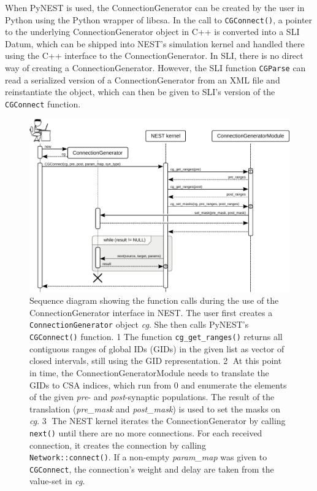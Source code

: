 \documentclass{frontiersSCNS} %
\begin{document}
When PyNEST is used, the ConnectionGenerator can be created by the
user in Python using the Python wrapper of libcsa. In the call to
\verb|CGConnect()|, a pointer to the underlying ConnectionGenerator
object in C++ is converted into a SLI Datum, which can be shipped into
NEST's simulation kernel and handled there using the C++ interface to
the ConnectionGenerator. In SLI, there is no direct way of creating a
ConnectionGenerator. However, the SLI function \verb|CGParse| can
read a serialized version of a ConnectionGenerator from an XML file
and reinstantiate the object, which can then be given to SLI's version
of the \verb|CGConnect| function.

\begin{figure}[ht]
\centering
\includegraphics[scale=.8]{figures/sequence_diagram_nest.pdf}
\caption{Sequence diagram showing the function calls during the use of
  the ConnectionGenerator interface in NEST. The user first creates a
  \texttt{ConnectionGenerator} object \emph{cg}. She then calls
  PyNEST's \texttt{CGConnect()} function. \textcircled{\footnotesize
    1} The function \texttt{cg\_get\_ranges()} returns all contiguous
  ranges of global IDs (GIDs) in the given list as vector of closed
  intervals, still using the GID representation.
  \textcircled{\footnotesize 2} At this point in time, the
  ConnectionGeneratorModule needs to translate the GIDs to CSA
  indices, which run from 0 and enumerate the elements of the given
  \emph{pre}- and \emph{post}-synaptic populations. The result of the
  translation (\emph{pre\_mask} and \emph{post\_mask}) is used to set
  the masks on \emph{cg}. \textcircled{\footnotesize 3} The NEST
  kernel iterates the ConnectionGenerator by calling \texttt{next()}
  until there are no more connections. For each received connection,
  it creates the connection by calling \texttt{Network::connect()}. If
  a non-empty \emph{param\_map} was given to \texttt{CGConnect}, the
  connection's weight and delay are taken from the value-set in
  \emph{cg}.}\label{fig:sequence_diagram_nest}
\end{figure}
\end{document}
